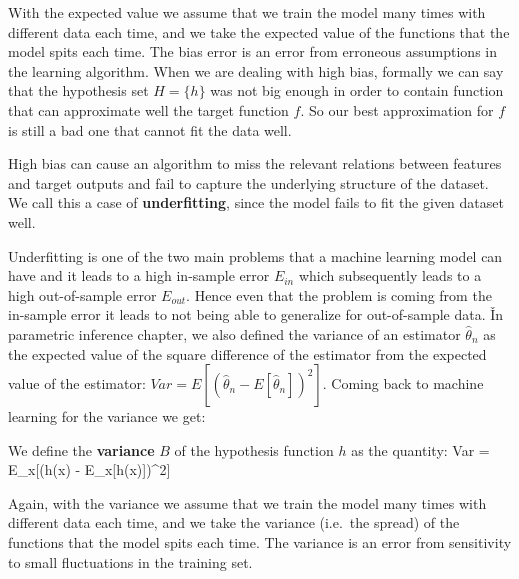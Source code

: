 With the expected value we assume that we train the model many times with different data each time, and we take the
expected value of the functions that the model spits each time. The bias error is an error from erroneous assumptions
in the learning algorithm. When we are dealing with high bias, formally we can say that the hypothesis set $H=\{h\}$
was not big enough in order to contain function that can approximate well the target function $f$. So our best
approximation for $f$ is still a bad one that cannot fit the data well.

\vspace{-5pt}


\vspace{-5pt}

High bias can cause an algorithm to miss the relevant relations between features and target outputs and fail to
capture the underlying structure of the dataset. We call this a case of \textbf{underfitting}, since the model fails
to fit the given dataset well.

\vspace{-10pt}


\vspace{-10pt}

Underfitting is one of the two main problems that a machine learning model can have and it leads to a high in-sample
error $E_{in}$ which subsequently leads to a high out-of-sample error $E_{out}$. Hence even that the problem is
coming from the in-sample error it leads to not being able to generalize for out-of-sample data. \v

In parametric inference chapter, we also defined the variance of an estimator $\hat{\theta}_{n}$ as the expected
value of the square difference of the estimator from the expected value of the estimator: $Var = E[(\hat{\theta}_{n}
- E[\hat{\theta}_{n}])^2]$. Coming back to machine learning for the variance we get:

\bd[Variance]
We define the \textbf{variance} $B$ of the hypothesis function $h$ as the quantity:
\bse
Var = E_{x}[(h(x) - E_{x}[h(x)])^2]
\ese
\ed

Again, with the variance we assume that we train the model many times with different data each time, and we take the
variance (i.e.\ the spread) of the functions that the model spits each time. The variance is an error from
sensitivity to small fluctuations in the training set.

